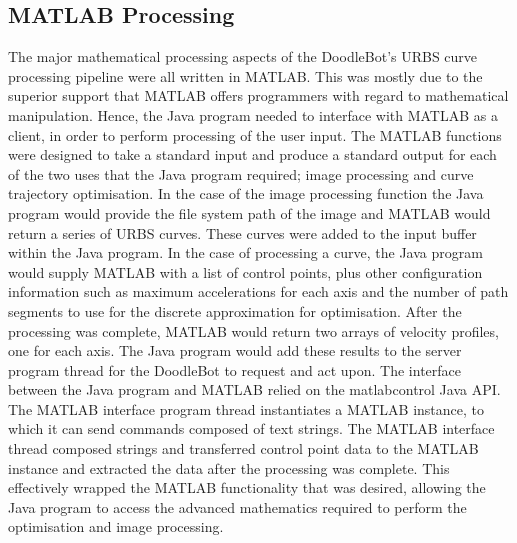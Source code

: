 \subsection{MATLAB\textsuperscript{\textregistered} Processing}
The major mathematical processing aspects of the DoodleBot's URBS curve processing pipeline were all written in MATLAB\textsuperscript{\textregistered}. This was mostly due to the superior support that MATLAB\textsuperscript{\textregistered} offers programmers with regard to mathematical manipulation. Hence, the Java program needed to interface with MATLAB\textsuperscript{\textregistered} as a client, in order to perform processing of the user input. The MATLAB\textsuperscript{\textregistered} functions were designed to take a standard input and produce a standard output for each of the two uses that the Java program required; image processing and curve trajectory optimisation. In the case of the image processing function the Java program would provide the file system path of the image and MATLAB\textsuperscript{\textregistered} would return a series of URBS curves. These curves were added to the input buffer within the Java program. In the case of processing a curve, the Java program would supply MATLAB\textsuperscript{\textregistered} with a list of control points, plus other configuration information such as maximum accelerations for each axis and the number of path segments to use for the discrete approximation for optimisation. After the processing was complete, MATLAB\textsuperscript{\textregistered} would return two arrays of velocity profiles, one for each axis. The Java program would add these results to the server program thread for the DoodleBot to request and act upon. The interface between the Java program and MATLAB\textsuperscript{\textregistered} relied on the matlabcontrol Java API. The MATLAB\textsuperscript{\textregistered} interface program thread instantiates a MATLAB\textsuperscript{\textregistered} instance, to which it can send commands composed of text strings. The MATLAB\textsuperscript{\textregistered} interface thread composed strings and transferred control point data to the MATLAB\textsuperscript{\textregistered} instance and extracted the data after the processing was complete. This effectively wrapped the MATLAB\textsuperscript{\textregistered} functionality that was desired, allowing the Java program to access the advanced mathematics required to perform the optimisation and image processing.